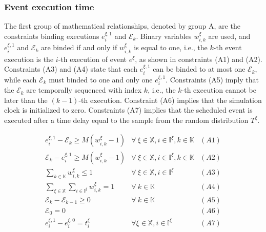 \documentclass[]{interact}
\theoremstyle{plain}%
\theoremstyle{definition}
\theoremstyle{remark}
\begin{document}
\subsubsection{Event execution time} \label{sec:const_A}
The first group of mathematical relationships, denoted by group A, are the constraints binding executions $e^{\xi,1}_i$ and $\mathcal{E}_k$. Binary variables $w^{\xi}_{i,k}$ are used, and $e^{\xi,1}_i$ and $\mathcal{E}_k$ are binded if and only if $w^{\xi}_{i,k}$ is equal to one, i.e., the $k$-th event execution is the $i$-th execution of event $e^{\xi}$, as shown in constraints (A1) and (A2). Constraints (A3) and (A4) state that each $e^{\xi,1}_i$ can be binded to at most one $\mathcal{E}_k$, while each $\mathcal{E}_k$ must binded to one and only one $e^{\xi,1}_i$. Constraints (A5) imply that the $\mathcal{E}_{k}$ are temporally sequenced with index $k$, i.e., the $k$-th execution cannot be later than the $(k-1)$-th execution. Constraint (A6) implies that the simulation clock is initialized to zero. Constraints (A7) implies that the scheduled event is executed after a time delay equal to the sample from the random distribution $T^{\xi}$.

\begin{eqnarray}
e^{\xi,1}_i-\mathcal{E}_k\ge M(w^{\xi}_{i,k}-1) & \forall\ \xi\in\mathbb{X},i\in \mathbb{I}^{\xi},k\in \mathbb{K}&(A1)\nonumber\\
\mathcal{E}_k-e^{\xi,1}_i\ge M(w^{\xi}_{i,k}-1) & \forall\ \xi\in\mathbb{X},i\in \mathbb{I}^{\xi},k\in \mathbb{K}&(A2)\nonumber\\
\sum_{k\in \mathbb{K}} w^{\xi}_{i,k} \le 1& \forall\ \xi\in\mathbb{X},i\in \mathbb{I}^{\xi}&(A3)\nonumber\\
\sum_{\xi\in \mathbb{X}}\sum_{i\in \mathbb{I}^{\xi}} w^{\xi}_{i,k} =1&\forall\ k\in \mathbb{K}&(A4)\nonumber\\
\mathcal{E}_{k}-\mathcal{E}_{k-1}\ge 0&\forall\ k\in \mathbb{K}&(A5)\nonumber\\
\mathcal{E}_0 = 0&&(A6)\nonumber\\
e^{\xi,1}_{i} - e^{\xi,0}_{i} = t^{\xi}_{i} & \forall \xi\in\mathbb{X}, i\in \mathbb{I}^{\xi}&(A7) \nonumber
\end{eqnarray}
\end{document}
